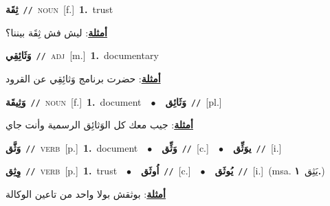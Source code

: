 \documentclass[10pt,a4paper,twoside]{article} %
\begin{document}
\begin{multicols}{2}
{\setlength\topsep{0pt}\textbf{\foreignlanguage{arabic}{ثِقَة}}\ {\color{gray}\texttt{//}\color{black}}\ \textsc{noun}\ [f.]\ \textbf{1.}~trust\  \begin{flushright}\color{gray}\foreignlanguage{arabic}{\textbf{\underline{\foreignlanguage{arabic}{أمثلة}}}: ليش فش ثِقَة بيننا؟}\end{flushright}\color{black}} \vspace{2mm}

{\setlength\topsep{0pt}\textbf{\foreignlanguage{arabic}{وَثَائِقِي}}\ {\color{gray}\texttt{//}\color{black}}\ \textsc{adj}\ [m.]\ \textbf{1.}~documentary\  \begin{flushright}\color{gray}\foreignlanguage{arabic}{\textbf{\underline{\foreignlanguage{arabic}{أمثلة}}}: حضرت برنامج وَثائِقِي عن القرود}\end{flushright}\color{black}} \vspace{2mm}

{\setlength\topsep{0pt}\textbf{\foreignlanguage{arabic}{وَثِيقَة}}\ {\color{gray}\texttt{//}\color{black}}\ \textsc{noun}\ [f.]\ \textbf{1.}~document\ \ $\bullet$\ \ \setlength\topsep{0pt}\textbf{\foreignlanguage{arabic}{وَثَائِق}}\ {\color{gray}\texttt{//}\color{black}}\ [pl.]\  \begin{flushright}\color{gray}\foreignlanguage{arabic}{\textbf{\underline{\foreignlanguage{arabic}{أمثلة}}}: جيب معك كل الوَثائِق الرسمية وأنت جاي}\end{flushright}\color{black}} \vspace{2mm}

{\setlength\topsep{0pt}\textbf{\foreignlanguage{arabic}{وَثَّق}}\ {\color{gray}\texttt{//}\color{black}}\ \textsc{verb}\ [p.]\ \textbf{1.}~document\ \ $\bullet$\ \ \setlength\topsep{0pt}\textbf{\foreignlanguage{arabic}{وَثِّق}}\ {\color{gray}\texttt{//}\color{black}}\ [c.]\ \ $\bullet$\ \ \setlength\topsep{0pt}\textbf{\foreignlanguage{arabic}{يوَثِّق}}\ {\color{gray}\texttt{//}\color{black}}\ [i.]\ } \vspace{2mm}

{\setlength\topsep{0pt}\textbf{\foreignlanguage{arabic}{وِثِق}}\ {\color{gray}\texttt{//}\color{black}}\ \textsc{verb}\ [p.]\ \textbf{1.}~trust\ \ $\bullet$\ \ \setlength\topsep{0pt}\textbf{\foreignlanguage{arabic}{اُوثَق}}\ {\color{gray}\texttt{//}\color{black}}\ [c.]\ \ $\bullet$\ \ \setlength\topsep{0pt}\textbf{\foreignlanguage{arabic}{يُوثَق}}\ {\color{gray}\texttt{//}\color{black}}\ [i.]\ \color{gray}(msa. \foreignlanguage{arabic}{يَثِق}~\foreignlanguage{arabic}{\textbf{١.}})\color{black}\  \begin{flushright}\color{gray}\foreignlanguage{arabic}{\textbf{\underline{\foreignlanguage{arabic}{أمثلة}}}: بوثقش بولا واحد من تاعين الوكالة}\end{flushright}\color{black}} \vspace{2mm}


\end{multicols}
\end{document}
